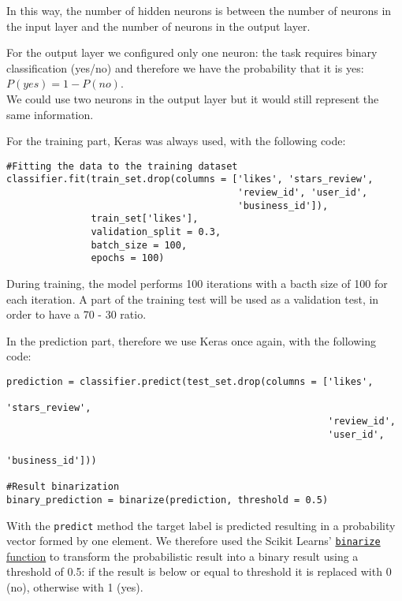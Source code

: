 In this way, the number of hidden neurons is between the number of neurons in the input layer and the number of neurons in the output layer.

For the output layer we configured only one neuron: the task requires binary classification (yes/no) and therefore we have the probability that it is yes: $P(yes) = 1 - P(no)$.\\
We could use two neurons in the output layer but it would still represent the same information.

For the training part, Keras was always used, with the following code:

\begin{lstlisting}[caption={Neural Network training},label={lst:nn-fit}]
#Fitting the data to the training dataset
classifier.fit(train_set.drop(columns = ['likes', 'stars_review', 
                                         'review_id', 'user_id', 
                                         'business_id']), 
               train_set['likes'], 
               validation_split = 0.3, 
               batch_size = 100, 
               epochs = 100)
\end{lstlisting}

During training, the model performs 100 iterations with a bacth size of 100 for each iteration. A part of the training test will be used as a validation test, in order to have a 70 - 30 ratio.

In the prediction part, therefore we use Keras once again, with the following code:

\begin{lstlisting}[caption={Neural Network predictions},label={lst:nn-pred}]
prediction = classifier.predict(test_set.drop(columns = ['likes', 
                                                         'stars_review',
                                                         'review_id',
                                                         'user_id',
                                                         'business_id']))

#Result binarization
binary_prediction = binarize(prediction, threshold = 0.5)
\end{lstlisting}

With the \texttt{predict} method the target label is predicted resulting in a probability vector formed by one element. We therefore used the Scikit Learns' \href{https://scikit-learn.org/stable/modules/generated/sklearn.preprocessing.binarize.html}{\texttt{binarize} function} to transform the probabilistic result into a binary result using a threshold of 0.5: if the result is below or equal to threshold it is replaced with 0 (no), otherwise with 1 (yes).



